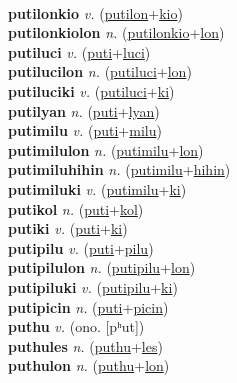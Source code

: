  \label{putilon} \\
\textbf{putilonkio} \textit{v.} (\hyperref[putilon]{putilon}+\hyperref[kio]{kio})
 \label{putilonkio} \\
\textbf{putilonkiolon} \textit{n.} (\hyperref[putilonkio]{putilonkio}+\hyperref[lon]{lon})
 \label{putilonkiolon} \\
\textbf{putiluci} \textit{v.} (\hyperref[puti]{puti}+\hyperref[luci]{luci})
 \label{putiluci} \\
\textbf{putilucilon} \textit{n.} (\hyperref[putiluci]{putiluci}+\hyperref[lon]{lon})
 \label{putilucilon} \\
\textbf{putiluciki} \textit{v.} (\hyperref[putiluci]{putiluci}+\hyperref[ki]{ki})
 \label{putiluciki} \\
\textbf{putilyan} \textit{n.} (\hyperref[puti]{puti}+\hyperref[lyan]{lyan})
 \label{putilyan} \\
\textbf{putimilu} \textit{v.} (\hyperref[puti]{puti}+\hyperref[milu]{milu})
 \label{putimilu} \\
\textbf{putimilulon} \textit{n.} (\hyperref[putimilu]{putimilu}+\hyperref[lon]{lon})
 \label{putimilulon} \\
\textbf{putimiluhihin} \textit{n.} (\hyperref[putimilu]{putimilu}+\hyperref[hihin]{hihin})
 \label{putimiluhihin} \\
\textbf{putimiluki} \textit{v.} (\hyperref[putimilu]{putimilu}+\hyperref[ki]{ki})
 \label{putimiluki} \\
\textbf{putikol} \textit{n.} (\hyperref[puti]{puti}+\hyperref[kol]{kol})
 \label{putikol} \\
\textbf{putiki} \textit{v.} (\hyperref[puti]{puti}+\hyperref[ki]{ki})
 \label{putiki} \\
\textbf{putipilu} \textit{v.} (\hyperref[puti]{puti}+\hyperref[pilu]{pilu})
 \label{putipilu} \\
\textbf{putipilulon} \textit{n.} (\hyperref[putipilu]{putipilu}+\hyperref[lon]{lon})
 \label{putipilulon} \\
\textbf{putipiluki} \textit{v.} (\hyperref[putipilu]{putipilu}+\hyperref[ki]{ki})
 \label{putipiluki} \\
\textbf{putipicin} \textit{n.} (\hyperref[puti]{puti}+\hyperref[picin]{picin})
 \label{putipicin} \\
\textbf{puthu} \textit{v.} (ono. [pʰut])
 \label{puthu} \\
\textbf{puthules} \textit{n.} (\hyperref[puthu]{puthu}+\hyperref[les]{les})
 \label{puthules} \\
\textbf{puthulon} \textit{n.} (\hyperref[puthu]{puthu}+\hyperref[lon]{lon})
